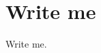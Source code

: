 \documentclass{article}
\begin{document}

% 


\section{Write me}
\label{sec:write-me}
Write me.~\cite{www:pdflatex-makefile}


% 
\end{document}
